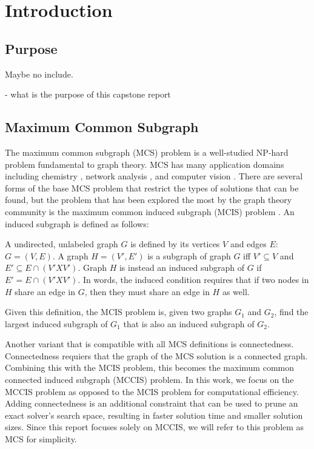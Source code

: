 \section{Introduction}
\subsection{Purpose}
Maybe no include.

- what is the purpose of this capstone report

\subsection{Maximum Common Subgraph}
The maximum common subgraph (MCS) problem is a well-studied NP-hard problem \cite{bunke1997relation, mcgregor1982backtrack, levi1973note, kann1992approximability} fundamental to graph theory. MCS has many application domains including chemistry \cite{duesbury2018comparison}, network analysis \cite{larsen2017cytomcs}, and computer vision \cite{bunke1998graph}. There are several forms of the base MCS problem that restrict the types of solutions that can be found, but the problem that has been explored the most by the graph theory community is the maximum common induced subgraph (MCIS) problem \cite{vismara2008finding}. An induced subgraph is defined as follows:

A undirected, unlabeled graph $G$ is defined by its vertices $V$ and edges $E$: $G = (V, E)$. A graph $H = (V', E')$ is a subgraph of graph $G$ iff $V' \subseteq V$ and $E' \subseteq E \cap (V' X V')$. Graph $H$ is instead an induced subgraph of $G$ if $E' = E \cap (V' X V')$. In words, the induced condition requires that if two nodes in $H$ share an edge in $G$, then they must share an edge in $H$ as well. 


Given this definition, the MCIS problem is, given two graphs $G_1$ and $G_2$, find the largest induced subgraph of $G_1$ that is also an induced subgraph of $G_2$. 

Another variant that is compatible with all MCS definitions is connectedness. Connectedness requiers that the graph of the MCS solution is a connected graph. Combining this with the MCIS problem, this becomes the maximum common connected induced subgraph (MCCIS) problem. In this work, we focus on the MCCIS problem as opposed to the MCIS problem for computational efficiency. Adding connectedness is an additional constraint that can be used to prune an exact solver's search space, resulting in faster solution time and smaller solution sizes. Since this report focuses solely on MCCIS, we will refer to this problem as MCS for simplicity.


